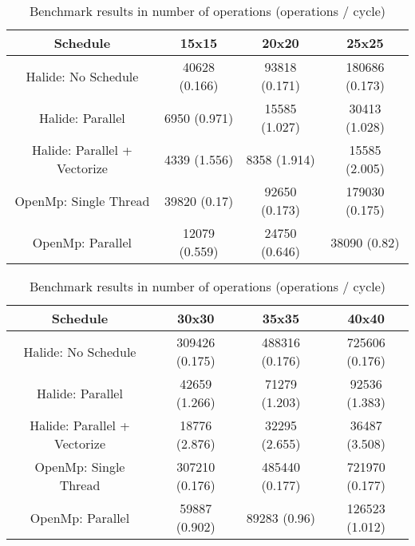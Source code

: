 
\begin{table}[ht]
\begin{center}
\begin{tabular}{|c||c|c|c|}
\hline
Schedule& 15x15& 20x20& 25x25\\ 
\hline
\hline
Halide: No Schedule& 40628 (0.166)& 93818 (0.171)& 180686 (0.173)\\ 
\hline
Halide: Parallel& 6950 (0.971)& 15585 (1.027)& 30413 (1.028)\\ 
\hline
Halide: Parallel + Vectorize& 4339 (1.556)& 8358 (1.914)& 15585 (2.005)\\ 
\hline
OpenMp: Single Thread& 39820 (0.17)& 92650 (0.173)& 179030 (0.175)\\ 
\hline
	OpenMp: Parallel &  12079 (0.559)& 24750 (0.646)& 38090 (0.82)\\ 
\hline

\end{tabular}
\begin{tabular}{|c||c|c|c|}
\hline
Schedule& 30x30& 35x35& 40x40\\ 
\hline
\hline
Halide: No Schedule& 309426 (0.175)& 488316 (0.176)& 725606 (0.176)\\ 
\hline
Halide: Parallel& 42659 (1.266)& 71279 (1.203)& 92536 (1.383)\\ 
\hline
Halide: Parallel + Vectorize& 18776 (2.876)& 32295 (2.655)& 36487 (3.508)\\ 
\hline
OpenMp: Single Thread& 307210 (0.176)& 485440 (0.177)& 721970 (0.177)\\ 
\hline
OpenMp: Parallel & 59887 (0.902)& 89283 (0.96)& 126523 (1.012)\\ 
\hline

\end{tabular}
\end{center}
\caption{Benchmark results in number of operations (operations / cycle)}
	\label{Table:Benchmarks}
\end{table}

